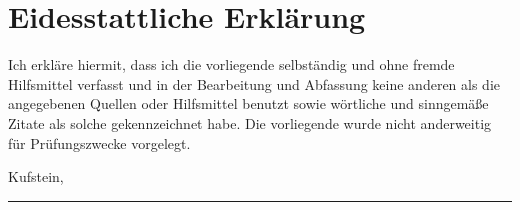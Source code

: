 \chapter*{Eidesstattliche Erklärung}
\thispagestyle{empty}

Ich erkläre hiermit, dass ich die vorliegende \worktype selbständig und ohne fremde Hilfsmittel verfasst und in der Bearbeitung und Abfassung keine anderen als die angegebenen Quellen oder Hilfsmittel benutzt sowie wörtliche und sinngemäße Zitate als solche gekennzeichnet habe. Die vorliegende \worktype wurde nicht anderweitig für Prüfungszwecke vorgelegt.

\vspace{2cm}
Kufstein, \mydate

\vspace{2cm}
\rule{10cm}{1pt}\\
\myname{}


